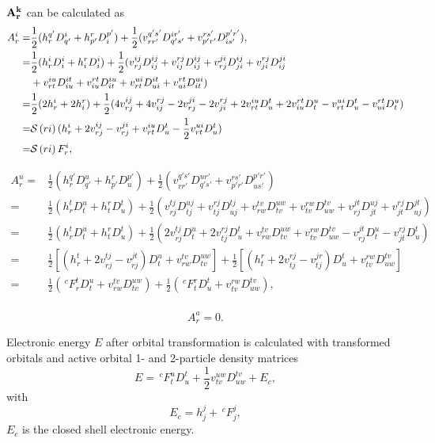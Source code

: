 \documentclass[a4paper,12pt,oneside]{book}
\newcommand{\sop}[1]{{\cal S}\left(#1\right)}
\newcommand{\pre}[1]{\,#1\!}
\begin{document}
$\bf{A}_r^k$ can be calculated as 
\begin{equation}
\begin{aligned}
  A_r^i=& \frac{1}{2}(h^{q'}_rD^i_{q'} + h^r_{p'}D^{p'}_i) + \frac{1}{2}(v^{q's'}_{rr'}D^{ir'}_{q's'}+v^{rs'}_{p'r'}D^{p'r'}_{is'}),\\
  =&\frac{1}{2}(h^i_rD^i_i+h^r_iD^i_i)+\frac{1}{2}(v^{ij}_{rj}D^{ij}_{ij}+v^{rj}_{ij}D^{ij}_{ij} +v^{ji}_{rj}D^{ij}_{ji} +v^{rj}_{ji}D^{ji}_{ij}\\
    &+ v^{iu}_{rt}D^{it}_{iu}+v_{iu}^{rt}D_{it}^{iu} + v^{ui}_{rt}D^{it}_{ui} + v^{rt}_{ui}D^{ui}_{it})\\
  =&\frac{1}{2}(2h^i_r+2h^r_i)+\frac{1}{2}(4v^{ij}_{rj}+4v^{rj}_{ij} -2v^{ji}_{rj} -2v^{rj}_{ji} + 2v^{iu}_{rt}D^t_u+2v_{iu}^{rt}D_t^u - v^{ui}_{rt}D^t_u - v^{rt}_{ui}D^u_t)\\
  =&\sop{ri}(h^i_r+2v^{ij}_{rj}-v^{ji}_{rj}+v^{iu}_{rt}D^t_u-\frac{1}{2}v^{ui}_{rt}D^t_u)\\
  =&\sop{ri} F_r^i,
\end{aligned}
\end{equation}

\begin{equation}
\begin{aligned}
  A_r^u=& \frac{1}{2}(h^{q'}_rD^u_{q'} + h^r_{p'}D^{p'}_u) + \frac{1}{2}(v^{q's'}_{rr'}D^{ur'}_{q's'}+v^{rs'}_{p'r'}D^{p'r'}_{us'})\\
  =&\frac{1}{2}(h^t_rD^u_t+h^r_tD^t_u) + \frac{1}{2}(v^{tj}_{rj}D^{uj}_{tj}+v^{rj}_{tj}D^{tj}_{uj}+v^{tv}_{rw}D^{uw}_{tv}+v^{rw}_{tv}D^{tv}_{uw}+v^{jt}_{rj}D^{uj}_{jt}+v^{rj}_{jt}D^{jt}_{uj})\\
  =&\frac{1}{2}(h^t_rD^u_t+h^r_tD^t_u) + \frac{1}{2}(2v^{tj}_{rj}D^u_t+2v^{rj}_{tj}D^t_u+v^{tv}_{rw}D^{uw}_{tv}+v^{rw}_{tv}D^{tv}_{uw}-v^{jt}_{rj}D^u_t-v^{rj}_{jt}D^t_u)\\
  =&\frac{1}{2}[(h^t_r + 2v^{tj}_{rj} - v^{jt}_{rj})D^u_t + v^{tv}_{rw}D^{uw}_{tv}] + \frac{1}{2}[(h^r_t + 2v^{rj}_{tj} - v^{jr}_{tj})D^t_u + v^{rw}_{tv}D^{tv}_{uw}]\\
  =&\frac{1}{2}(\pre{^c}F_r^tD^u_t+v^{tv}_{rw}D^{uw}_{tv}) + \frac{1}{2}(\pre{^c}F_t^rD^t_u+v^{rw}_{tv}D^{tv}_{uw}),\\
\end{aligned}
\end{equation}

\begin{equation}
  A_r^a=0.
\end{equation}

Electronic energy $E$ after orbital transformation is calculated with transformed orbitals and active orbital 1- and 2-particle density matrices
\begin{equation}
E=\pre{^c}F_t^uD^t_u+\frac{1}{2}v^{uw}_{tv}D^{tv}_{uw}+E_c,
\end{equation}
with
\begin{equation}
  E_c=h^j_j+\pre{^c}F_j^j,
\end{equation}
$E_c$ is the closed shell electronic energy.
\end{document}
